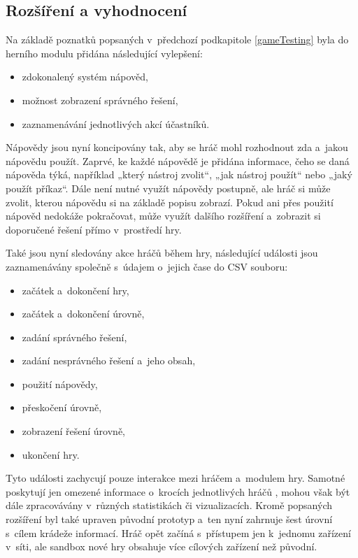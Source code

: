 \documentclass[
  digital, %
  oneside, %
  table,   %
  nolof,     %
  nolot,     %
]{fithesis3}
\begin{document}
\subsection{Rozšíření a vyhodnocení} \label{gameExtensions}
Na základě poznatků popsaných v~předchozí podkapitole \ref{gameTesting} byla do herního modulu přidána následující vylepšení:
\begin{itemize}
  \item zdokonalený systém nápověd,
  \item možnost zobrazení správného řešení,
  \item zaznamenávání jednotlivých akcí účastníků.
\end{itemize}
Nápovědy jsou nyní koncipovány tak, aby se hráč mohl rozhodnout zda a~jakou nápovědu použít. Zaprvé, ke každé nápovědě je přidána informace, čeho se daná nápověda týká, například „který nástroj zvolit“, „jak nástroj použít“ nebo „jaký použít příkaz“. Dále není nutné využít nápovědy postupně, ale hráč si může zvolit, kterou nápovědu si na základě popisu zobrazí. Pokud ani přes použití nápověd nedokáže pokračovat, může využít dalšího rozšíření a~zobrazit si doporučené řešení přímo v~prostředí hry. \cite{ctfDesign}\par
Také jsou nyní sledovány akce hráčů během hry, následující události jsou zaznamenávány společně s~údajem o~jejich čase do CSV souboru:
\begin{itemize}
  \item začátek a~dokončení hry,
  \item začátek a~dokončení úrovně,
  \item zadání správného řešení,
  \item zadání nesprávného řešení a~jeho obsah,
  \item použití nápovědy,
  \item přeskočení úrovně,
  \item zobrazení řešení úrovně,
  \item ukončení hry.
\end{itemize}
Tyto události zachycují pouze interakce mezi hráčem a~modulem hry. Samotné poskytují jen omezené informace o~krocích jednotlivých hráčů \cite{ctfDesign}, mohou však být dále zpracovávány v~různých statistikách či vizualizacích.
Kromě popsaných rozšíření byl také upraven původní prototyp a~ten nyní zahrnuje šest úrovní s~cílem krádeže informací. Hráč opět začíná s~přístupem jen k~jednomu zařízení v~síti, ale sandbox nové hry obsahuje více cílových zařízení než původní.\par
\end{document}
